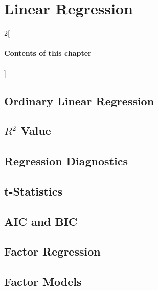 \chapter{Linear Regression}

\begin{multicols}{2}[\subsubsection*{Contents of this chapter}]
\end{multicols}



\section{Ordinary Linear Regression}

\section{$R^2$ Value}

\section{Regression Diagnostics}

\section{t-Statistics}

\section{AIC and BIC}

\section{Factor Regression}

\section{Factor Models}


\chapauthor{}

